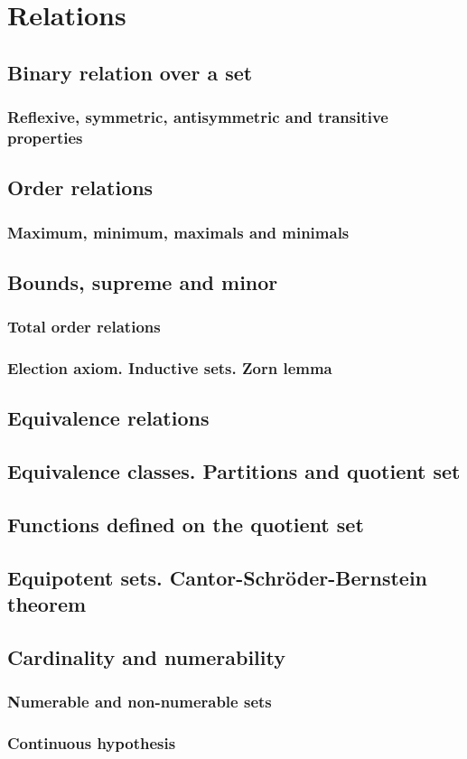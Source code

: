 \chapter{Relations}
\thispagestyle{noheaders}

\section{Binary relation over a set}
\subsection{Reflexive, symmetric, antisymmetric and transitive properties}

\section{Order relations}

\subsection{Maximum, minimum, maximals and minimals}

\section{Bounds, supreme and minor}

\subsection{Total order relations}

\subsection{Election axiom. Inductive sets. Zorn lemma}

\section{Equivalence relations}

\section{Equivalence classes. Partitions and quotient set}

\section{Functions defined on the quotient set}

\section{Equipotent sets. Cantor-Schröder-Bernstein theorem}

\section{Cardinality and numerability}

\subsection{Numerable and non-numerable sets}

\subsection{Continuous hypothesis}
